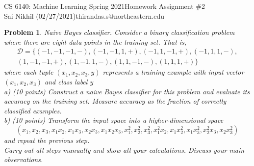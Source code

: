 \documentclass[8pt]{article}
\newtheorem{problem}{Problem}
\begin{document}
\noindent CS 6140: Machine Learning Spring 2021\hfill Homework Assignment \#2\\
Sai Nikhil (02/27/2021)\hfill thirandas.s@northeastern.edu

\hrulefill


\begin{problem}
Naive Bayes classifier. Consider a binary classification problem where there are eight data points in the training set. That is,
$$
\begin{aligned}
\mathcal{D}=\{(-1,-1,-1,-),(-1,-1,1,+),(-1,1,-1,+),(-1,1,1,-),\\(1,-1,-1,+),(1,-1,1,-),(1,1,-1,-),(1,1,1,+)\}
\end{aligned}
$$
where each tuple $\left(x_{1}, x_{2}, x_{3}, y\right)$ represents a training example with input vector $\left(x_{1}, x_{2}, x_{3}\right)$ and class label $y$\\
a) (10 points) Construct a naive Bayes classifier for this problem and evaluate its accuracy on the training set. Measure accuracy as the fraction of correctly classified examples.\\
b) (10 points) Transform the input space into a higher-dimensional space
$$
\left(x_{1}, x_{2}, x_{3}, x_{1} x_{2}, x_{1} x_{3}, x_{2} x_{3}, x_{1} x_{2} x_{3}, x_{1}^{2}, x_{2}^{2}, x_{3}^{2}, x_{1}^{2} x_{2}, x_{1} x_{2}^{2}, x_{1} x_{3}^{2}, x_{2}^{2} x_{3}, x_{2} x_{3}^{2}\right)
$$
and repeat the previous step.\\
Carry out all steps manually and show all your calculations. Discuss your main observations.
\end{problem}
\end{document}
